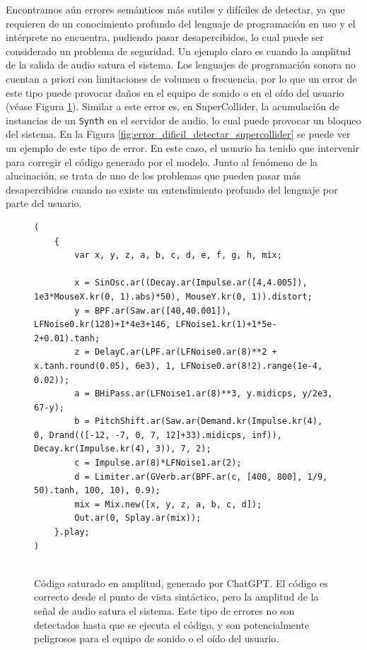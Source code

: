 Encontramos aún errores semánticos más sutiles y difíciles de detectar, ya que requieren de un conocimiento profundo del lenguaje de programación en uso y el intérprete no encuentra, pudiendo pasar desapercibidos, lo cual puede ser considerado un problema de seguridad. Un ejemplo claro es cuando la amplitud de la salida de audio satura el sistema. Los lenguajes de programación sonora no cuentan a priori con limitaciones de volumen o frecuencia, por lo que un error de este tipo puede provocar daños en el equipo de sonido o en el oído del usuario (véase Figura \ref{fig:amplitud_saturada_chatgpt}). Similar a este error es, en SuperCollider, la acumulación de instancias de un \texttt{Synth} en el servidor de audio, lo cual puede provocar un bloqueo del sistema. En la Figura \ref{fig:error_dificil_detectar_supercollider} se puede ver un ejemplo de este tipo de error. En este caso, el usuario ha tenido que intervenir para corregir el código generado por el modelo. Junto al fenómeno de la alucinación, se trata de uno de los problemas que pueden pasar más desapercibidos cuando no existe un entendimiento profundo del lenguaje por parte del usuario.

\begin{figure}[H]
    \caption[Código saturado en amplitud, generado por ChatGPT]{Código saturado en amplitud, generado por ChatGPT. El código es correcto desde el punto de vista sintáctico, pero la amplitud de la señal de audio satura el sistema. Este tipo de errores no son detectados hasta que se ejecuta el código, y son potencialmente peligrosos para el equipo de sonido o el oído del usuario.}
    \centering
    \begin{lstlisting}[style=SuperCollider-IDE, basicstyle=\footnotesize\ttfamily, numbers=none]
(
    {
        var x, y, z, a, b, c, d, e, f, g, h, mix;
        
        x = SinOsc.ar((Decay.ar(Impulse.ar([4,4.005]), 1e3*MouseX.kr(0, 1).abs)*50), MouseY.kr(0, 1)).distort;
        y = BPF.ar(Saw.ar([40,40.001]), LFNoise0.kr(128)+1*4e3+146, LFNoise1.kr(1)+1*5e-2+0.01).tanh;
        z = DelayC.ar(LPF.ar(LFNoise0.ar(8)**2 + x.tanh.round(0.05), 6e3), 1, LFNoise0.ar(8!2).range(1e-4, 0.02));
        a = BHiPass.ar(LFNoise1.ar(8)**3, y.midicps, y/2e3, 67-y);
        b = PitchShift.ar(Saw.ar(Demand.kr(Impulse.kr(4), 0, Drand(([-12, -7, 0, 7, 12]+33).midicps, inf)), Decay.kr(Impulse.kr(4), 3)), 7, 2);
        c = Impulse.ar(8)*LFNoise1.ar(2);
        d = Limiter.ar(GVerb.ar(BPF.ar(c, [400, 800], 1/9, 50).tanh, 100, 10), 0.9);
        mix = Mix.new([x, y, z, a, b, c, d]);
        Out.ar(0, Splay.ar(mix));
    }.play;
)
            
    \end{lstlisting}
    \source{\propio}
    \label{fig:amplitud_saturada_chatgpt}
\end{figure}



